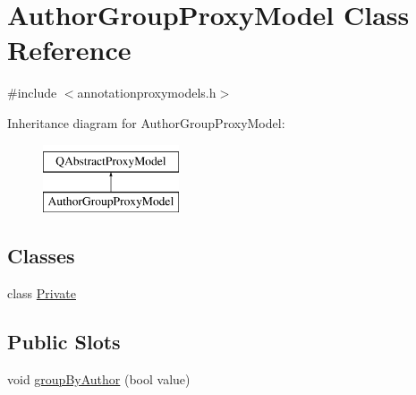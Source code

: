 \hypertarget{classAuthorGroupProxyModel}{\section{Author\+Group\+Proxy\+Model Class Reference}
\label{classAuthorGroupProxyModel}
}


{\ttfamily \#include $<$annotationproxymodels.\+h$>$}

Inheritance diagram for Author\+Group\+Proxy\+Model\+:\begin{figure}[H]
\begin{center}
\leavevmode
\includegraphics[height=2.000000cm]{classAuthorGroupProxyModel}
\end{center}
\end{figure}
\subsection*{Classes}
\begin{DoxyCompactItemize}
\item 
class \hyperlink{classAuthorGroupProxyModel_1_1Private}{Private}
\end{DoxyCompactItemize}
\subsection*{Public Slots}
\begin{DoxyCompactItemize}
\item 
void \hyperlink{classAuthorGroupProxyModel_a5e9d519b88078ba8f580f4780ab26558}{group\+By\+Author} (bool value)
\end{DoxyCompactItemize}
